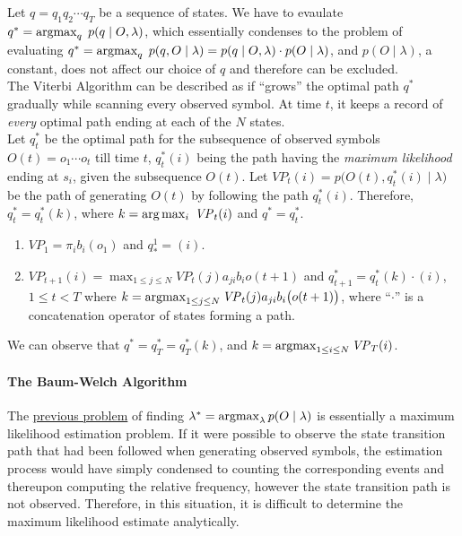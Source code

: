 Let $q = q_1 q_2 \cdots q_{T}$ be a sequence of states. We have to evaulate $q^{*} = \operatorname*{argmax}_{q} \hspace{1mm} p(q \mid O, \lambda)$, which essentially condenses to the problem of evaluating $q^{*} = \operatorname*{argmax}_{q} \hspace{1mm} p(q, O \mid \lambda) = p(q \mid O, \lambda) \cdot p(O \mid \lambda)$, and $p(O \mid \lambda)$, a constant, does not affect our choice of $q$ and therefore can be excluded.\\

The Viterbi Algorithm can be described as if \enquote{grows} the optimal path $q^{*}$ gradually while scanning every observed symbol. At time $t$, it keeps a record of \textit{every} optimal path ending at each of the $N$ states.\\

Let $q^{*}_{t}$ be the optimal path for the subsequence of observed symbols $O(t) = o_1 \cdots o_t$ till time $t$,  $q^{*}_{t}(i)$ being the path having the \textit{maximum likelihood} ending at $s_i$, given the subsequence $O(t)$. Let $\mathit{VP}_{t}(i) = p\big(O(t), q^{*}_{t}(i) \mid \lambda \big)$ be the path of generating $O(t)$ by following the path $q^{*}_{t}(i)$. Therefore, $q^{*}_{t} = q^{*}_{t}(k)$, where $k = \arg \max_{i} \hspace{1mm} \mathit{VP}_{t}(i)$ and $q^{*} = q^{*}_{t}$.

\begin{enumerate}
	\item{$\mathit{VP}_{1} = \pi_{i} b_{i}(o_1)$ and $q_{*}^{1} = (i)$.}
	\item{$\mathit{VP}_{t+1}(i) = \max_{1 \leq j \leq N} \mathit{VP}_{t}(j) a_{ji} b_{i} o(t+1)$ and $q^{*}_{t+1} = q_{t}^{*}(k)\cdot (i)$, $1 \leq t < T$ where $k = \operatorname*{argmax}_{1 \leq j \leq N} \mathit{VP}_{t}(j) a_{ji} b_{i} \big( o(t+1) \big)$,  where \enquote{$\cdot$} is a concatenation operator of states forming a path.}
\end{enumerate}

We can observe that $q^{*} = q^{*}_{T}  = q^{*}_{T}(k)$, and $k =\operatorname*{argmax}_{1 \leq i \leq N} \mathit{VP}_{T}(i)$. \\

\paragraph{The Baum-Welch Algorithm}
\label{baumwelch}

The \hyperref[viterbi]{previous problem} of finding $\lambda^{*} = \operatorname*{argmax}_{\lambda} p(O \mid \lambda)$ is essentially a maximum likelihood estimation problem. If it were possible to observe the state transition path that had been followed when generating observed symbols, the estimation process would have simply condensed to counting the corresponding events and thereupon computing the relative frequency, however the state transition path is not observed. Therefore, in this situation, it is difficult to determine the maximum likelihood estimate analytically.\\

